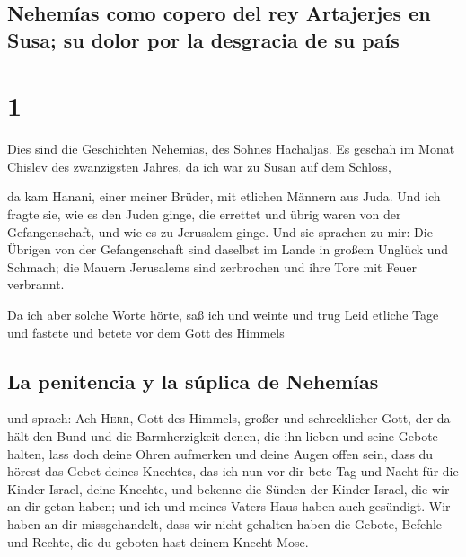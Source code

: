 \hypertarget{nehemuxedas-como-copero-del-rey-artajerjes-en-susa-su-dolor-por-la-desgracia-de-su-pauxeds}{%
\subsection{Nehemías como copero del rey Artajerjes en Susa; su dolor
por la desgracia de su
país}\label{nehemuxedas-como-copero-del-rey-artajerjes-en-susa-su-dolor-por-la-desgracia-de-su-pauxeds}}

\hypertarget{section}{%
\section{1}\label{section}}

 Dies sind die Geschichten Nehemias, des Sohnes Hachaljas.
Es geschah im Monat Chislev des zwanzigsten Jahres, da ich war zu Susan
auf dem Schloss,

 da kam Hanani, einer meiner Brüder, mit etlichen Männern
aus Juda. Und ich fragte sie, wie es den Juden ginge, die errettet und
übrig waren von der Gefangenschaft, und wie es zu Jerusalem ginge.
 Und sie sprachen zu mir: Die Übrigen von der
Gefangenschaft sind daselbst im Lande in großem Unglück und Schmach; die
Mauern Jerusalems sind zerbrochen und ihre Tore mit Feuer verbrannt.

 Da ich aber solche Worte hörte, saß ich und weinte und
trug Leid etliche Tage und fastete und betete vor dem Gott des Himmels

\hypertarget{la-penitencia-y-la-suxfaplica-de-nehemuxedas}{%
\subsection{La penitencia y la súplica de
Nehemías}\label{la-penitencia-y-la-suxfaplica-de-nehemuxedas}}

 und sprach: Ach \textsc{Herr}, Gott des Himmels, großer
und schrecklicher Gott, der da hält den Bund und die Barmherzigkeit
denen, die ihn lieben und seine Gebote halten,  lass doch
deine Ohren aufmerken und deine Augen offen sein, dass du hörest das
Gebet deines Knechtes, das ich nun vor dir bete Tag und Nacht für die
Kinder Israel, deine Knechte, und bekenne die Sünden der Kinder Israel,
die wir an dir getan haben; und ich und meines Vaters Haus haben auch
gesündigt.  Wir haben an dir missgehandelt, dass wir nicht
gehalten haben die Gebote, Befehle und Rechte, die du geboten hast
deinem Knecht Mose.


